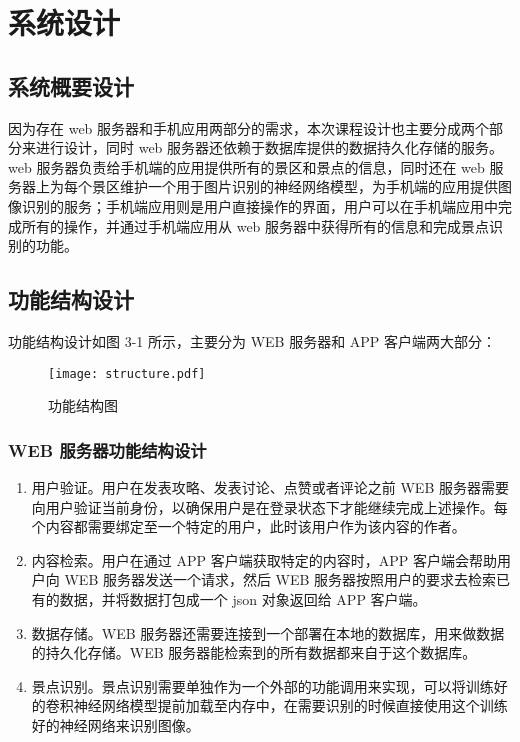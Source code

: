 \chapter{系统设计}

    \section{系统概要设计}

        因为存在 web 服务器和手机应用两部分的需求，本次课程设计也主要分成两个部分来进行设计，同时 web 服务器还依赖于数据库提供的数据持久化存储的服务。web 服务器负责给手机端的应用提供所有的景区和景点的信息，同时还在 web 服务器上为每个景区维护一个用于图片识别的神经网络模型，为手机端的应用提供图像识别的服务；手机端应用则是用户直接操作的界面，用户可以在手机端应用中完成所有的操作，并通过手机端应用从 web 服务器中获得所有的信息和完成景点识别的功能。

    \section{功能结构设计}

        功能结构设计如图 3-1 所示，主要分为 WEB 服务器和 APP 客户端两大部分：

        \begin{figure}[htbp]
            \texttt{[image: structure.pdf]}
            \centering
            \caption{功能结构图}
        \end{figure}

        \subsection{WEB 服务器功能结构设计}

        \begin{enumerate}
            
            \item 用户验证。用户在发表攻略、发表讨论、点赞或者评论之前 WEB 服务器需要向用户验证当前身份，以确保用户是在登录状态下才能继续完成上述操作。每个内容都需要绑定至一个特定的用户，此时该用户作为该内容的作者。

            \item 内容检索。用户在通过 APP 客户端获取特定的内容时，APP 客户端会帮助用户向 WEB 服务器发送一个请求，然后 WEB 服务器按照用户的要求去检索已有的数据，并将数据打包成一个 json 对象返回给 APP 客户端。

            \item 数据存储。WEB 服务器还需要连接到一个部署在本地的数据库，用来做数据的持久化存储。WEB 服务器能检索到的所有数据都来自于这个数据库。

            \item 景点识别。景点识别需要单独作为一个外部的功能调用来实现，可以将训练好的卷积神经网络模型提前加载至内存中，在需要识别的时候直接使用这个训练好的神经网络来识别图像。

        \end{enumerate}


